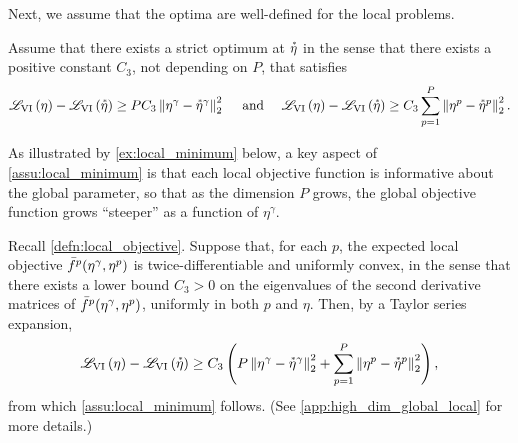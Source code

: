 Next, we assume that the optima are well-defined for the local
problems.%
%
%
\begin{assu} \label{assu:local_minimum}
%
Assume that there exists a strict optimum at $\accentset{*}{\eta}$ in the sense that there
exists a positive constant $C_3$, not depending on $P$, that satisfies
%
\begin{align*}
%
\klfullobj{\eta} - \klfullobj{\etastar} \ge
    P C_3 \norm{\eta^\gamma - \etastar^\gamma}_2^2
\quad\textrm{ and }\quad
\klfullobj{\eta} - \klfullobj{\etastar} \ge
    C_3 \sum_{p=1}^P \norm{\eta^p - \etastar^p}_2^2.
%
\end{align*}
%
\end{assu}
%

As illustrated by \cref{ex:local_minimum} below, a key aspect of
\cref{assu:local_minimum} is that each local objective function is informative
about the global parameter, so that as the dimension $P$ grows, the global
objective function grows ``steeper'' as a function of $\eta^\gamma$.

\begin{example}\label{ex:local_minimum}
%
Recall \cref{defn:local_objective}.  
Suppose that, for each $p$, the expected local objective $\bar{f}^p(\eta^\gamma,
\eta^p)$ is twice-differentiable and uniformly convex, in the sense that there
exists a lower bound $C_3 > 0$ on the eigenvalues of the second derivative matrices
of $\bar{f}^p(\eta^\gamma, \eta^p)$, uniformly in both $p$ and $\eta$.  Then, by a
Taylor series expansion,
%
\begin{align*}
%
\klfullobj{\eta} - \klfullobj{\etastar} \ge
    C_3 \left( P  \norm{\eta^\gamma - \etastar^\gamma}_2^2 +
    \sump \norm{\eta^p - \etastar^p}_2^2
    \right),
%
\end{align*}
%
from which \cref{assu:local_minimum} follows.  (See
\cref{app:high_dim_global_local} for more details.)
%
\end{example}
%


